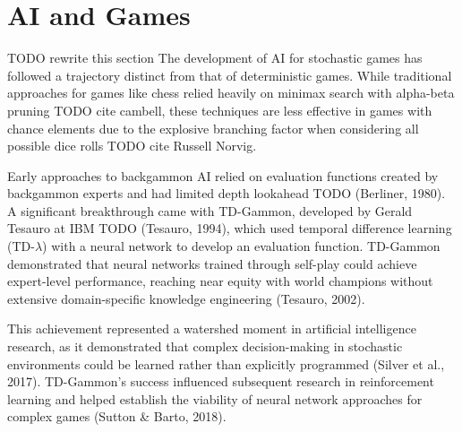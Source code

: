 \section{AI and Games}
TODO rewrite this section
The development of AI for stochastic games has followed a trajectory distinct from that of deterministic games. 
While traditional approaches for games like chess relied heavily on minimax search with alpha-beta pruning TODO cite cambell, these techniques are less effective in games with chance elements due to the explosive branching factor when considering all possible dice rolls TODO cite Russell Norvig.

Early approaches to backgammon AI relied on evaluation functions created by backgammon experts and had limited depth lookahead TODO (Berliner, 1980). A significant breakthrough came with TD-Gammon, developed by Gerald Tesauro at IBM TODO (Tesauro, 1994), which used temporal difference learning (TD-$\lambda$) with a neural network to develop an evaluation function. TD-Gammon demonstrated that neural networks trained through self-play could achieve expert-level performance, reaching near equity with world champions without extensive domain-specific knowledge engineering (Tesauro, 2002).

This achievement represented a watershed moment in artificial intelligence research, as it demonstrated that complex decision-making in stochastic environments could be learned rather than explicitly programmed (Silver et al., 2017). TD-Gammon's success influenced subsequent research in reinforcement learning and helped establish the viability of neural network approaches for complex games (Sutton \& Barto, 2018).








